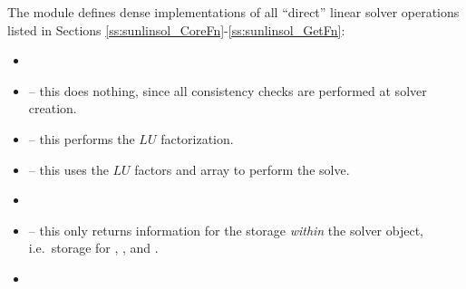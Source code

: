 
\noindent The {\sunlinsoldense} module defines dense implementations of all
``direct'' linear solver operations listed in Sections
\ref{ss:sunlinsol_CoreFn}-\ref{ss:sunlinsol_GetFn}:
\begin{itemize}
\item {}
\item {} -- this does nothing, since all
  consistency checks are performed at solver creation.
\item {} -- this performs the $LU$ factorization.
\item {} -- this uses the $LU$ factors
  and  array to perform the solve.
\item {}
\item {} -- this only returns information for
  the storage \emph{within} the solver object, i.e.~storage
  for , , and .
\item {}
\end{itemize}
